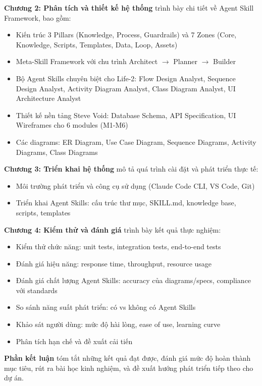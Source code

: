 \documentclass[13pt,a4paper,oneside]{extreport}
\numberwithin{equation}{chapter}
\numberwithin{figure}{chapter}
\numberwithin{table}{chapter}
\begin{document}
\textbf{Chương 2: Phân tích và thiết kế hệ thống} trình bày chi tiết về Agent Skill Framework, bao gồm:
\begin{itemize}
    \item Kiến trúc 3 Pillars (Knowledge, Process, Guardrails) và 7 Zones (Core, Knowledge, Scripts, Templates, Data, Loop, Assets)
    \item Meta-Skill Framework với chu trình Architect $\rightarrow$ Planner $\rightarrow$ Builder
    \item Bộ Agent Skills chuyên biệt cho Life-2: Flow Design Analyst, Sequence Design Analyst, Activity Diagram Analyst, Class Diagram Analyst, UI Architecture Analyst
    \item Thiết kế nền tảng Steve Void: Database Schema, API Specification, UI Wireframes cho 6 modules (M1-M6)
    \item Các diagrams: ER Diagram, Use Case Diagram, Sequence Diagrams, Activity Diagrams, Class Diagrams
\end{itemize}

\textbf{Chương 3: Triển khai hệ thống} mô tả quá trình cài đặt và phát triển thực tế:
\begin{itemize}
    \item Môi trường phát triển và công cụ sử dụng (Claude Code CLI, VS Code, Git)
    \item Triển khai Agent Skills: cấu trúc thư mục, SKILL.md, knowledge base, scripts, templates
\end{itemize}

\textbf{Chương 4: Kiểm thử và đánh giá} trình bày kết quả thực nghiệm:
\begin{itemize}
    \item Kiểm thử chức năng: unit tests, integration tests, end-to-end tests
    \item Đánh giá hiệu năng: response time, throughput, resource usage
    \item Đánh giá chất lượng Agent Skills: accuracy của diagrams/specs, compliance với standards
    \item So sánh năng suất phát triển: có vs không có Agent Skills
    \item Khảo sát người dùng: mức độ hài lòng, ease of use, learning curve
    \item Phân tích hạn chế và đề xuất cải tiến
\end{itemize}

\textbf{Phần kết luận} tóm tắt những kết quả đạt được, đánh giá mức độ hoàn thành mục tiêu, rút ra bài học kinh nghiệm, và đề xuất hướng phát triển tiếp theo cho dự án.
\end{document}
